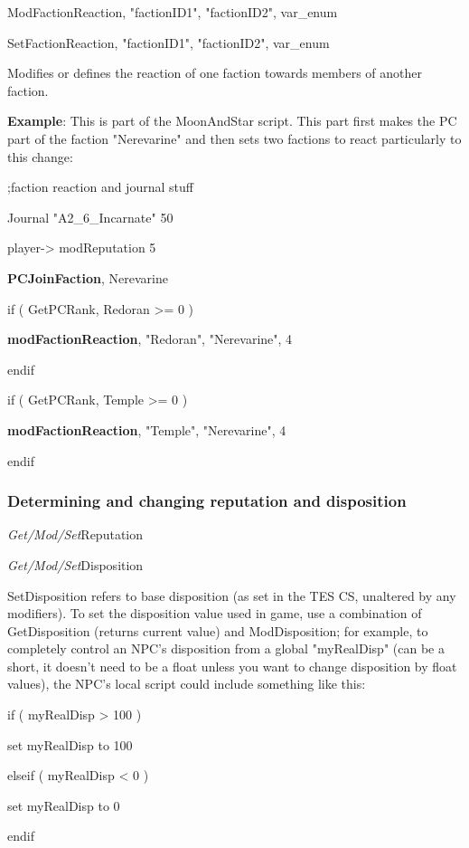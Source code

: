 ModFactionReaction, "factionID1", "factionID2", var\_enum

SetFactionReaction, "factionID1", "factionID2", var\_enum

Modifies or defines the reaction of one faction towards members of
another faction.

\textbf{Example}: This is part of the MoonAndStar script. This part
first makes the PC part of the faction "Nerevarine" and then sets two
factions to react particularly to this change:

;faction reaction and journal stuff

Journal "A2\_6\_Incarnate" 50

player-> modReputation 5

\textbf{PCJoinFaction}, Nerevarine

if ( GetPCRank, Redoran >= 0 )

\textbf{modFactionReaction}, "Redoran", "Nerevarine", 4

endif

if ( GetPCRank, Temple >= 0 )

\textbf{modFactionReaction}, "Temple", "Nerevarine", 4

endif

\hypertarget{determining-and-changing-reputation-and-disposition}{%
\subsubsection{Determining and changing reputation and
disposition}\label{determining-and-changing-reputation-and-disposition}}

\emph{Get/Mod/Set}Reputation

\emph{Get/Mod/Set}Disposition

SetDisposition refers to base disposition (as set in the TES CS,
unaltered by any modifiers). To set the disposition value used in game,
use a combination of GetDisposition (returns current value) and
ModDisposition; for example, to completely control an NPC's disposition
from a global "myRealDisp" (can be a short, it doesn't need to be a
float unless you want to change disposition by float values), the NPC's
local script could include something like this:

if ( myRealDisp > 100 )

set myRealDisp to 100

elseif ( myRealDisp < 0 )

set myRealDisp to 0

endif

